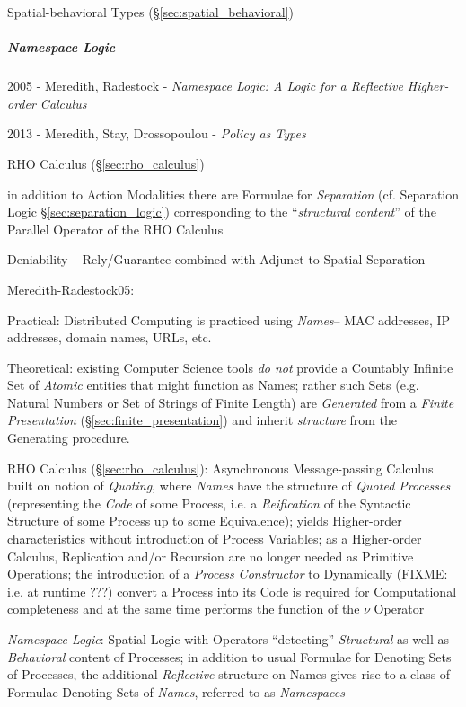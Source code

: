 Spatial-behavioral Types (\S\ref{sec:spatial_behavioral})



\subparagraph{Namespace Logic}\label{sec:namespace_logic}
\hfill

2005 - Meredith, Radestock - \emph{Namespace Logic: A Logic for a Reflective
  Higher-order Calculus}

2013 - Meredith, Stay, Drossopoulou - \emph{Policy as Types}

RHO Calculus (\S\ref{sec:rho_calculus})

in addition to Action Modalities there are Formulae for \emph{Separation} (cf.
Separation Logic \S\ref{sec:separation_logic}) corresponding to the
``\emph{structural content}'' of the Parallel Operator of the RHO Calculus

Deniability -- Rely/Guarantee combined with Adjunct to Spatial Separation

\asterism

Meredith-Radestock05:

Practical: Distributed Computing is practiced using \emph{Names}-- MAC
addresses, IP addresses, domain names, URLs, etc.

Theoretical: existing Computer Science tools \emph{do not} provide a Countably
Infinite Set of \emph{Atomic} entities that might function as Names; rather such
Sets (e.g. Natural Numbers or Set of Strings of Finite Length) are
\emph{Generated} from a \emph{Finite Presentation}
(\S\ref{sec:finite_presentation}) and inherit \emph{structure} from the
Generating procedure.

RHO Calculus (\S\ref{sec:rho_calculus}): Asynchronous Message-passing Calculus
built on notion of \emph{Quoting}, where \emph{Names} have the structure of
\emph{Quoted Processes} (representing the \emph{Code} of some Process, i.e. a
\emph{Reification} of the Syntactic Structure of some Process up to some
Equivalence); yields Higher-order characteristics without introduction of
Process Variables; as a Higher-order Calculus, Replication and/or Recursion are
no longer needed as Primitive Operations; the introduction of a \emph{Process
  Constructor} to Dynamically (FIXME: i.e. at runtime ???) convert a Process
into its Code is required for Computational completeness and at the same time
performs the function of the $\nu$ Operator

\emph{Namespace Logic}: Spatial Logic with Operators ``detecting''
\emph{Structural} as well as \emph{Behavioral} content of Processes; in addition
to usual Formulae for Denoting Sets of Processes, the additional
\emph{Reflective} structure on Names gives rise to a class of Formulae Denoting
Sets of \emph{Names}, referred to as \emph{Namespaces}

